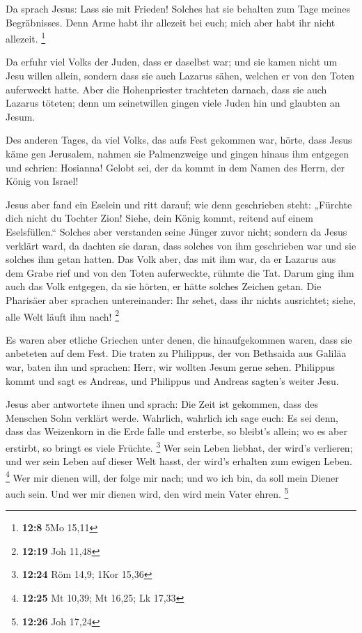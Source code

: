  Da sprach Jesus: Lass sie mit Frieden! Solches hat sie
behalten zum Tage meines Begräbnisses.  Denn Arme habt ihr
allezeit bei euch; mich aber habt ihr nicht allezeit. \footnote{\textbf{12:8}
  5Mo 15,11}

 Da erfuhr viel Volks der Juden, dass er daselbst war; und
sie kamen nicht um Jesu willen allein, sondern dass sie auch Lazarus
sähen, welchen er von den Toten auferweckt hatte.  Aber die
Hohenpriester trachteten darnach, dass sie auch Lazarus töteten;
 denn um seinetwillen gingen viele Juden hin und glaubten
an Jesum.

 Des anderen Tages, da viel Volks, das aufs Fest gekommen
war, hörte, dass Jesus käme gen Jerusalem,  nahmen sie
Palmenzweige und gingen hinaus ihm entgegen und schrien: Hosianna!
Gelobt sei, der da kommt in dem Namen des Herrn, der König von Israel!

 Jesus aber fand ein Eselein und ritt darauf; wie denn
geschrieben steht:  „Fürchte dich nicht du Tochter Zion!
Siehe, dein König kommt, reitend auf einem Eselsfüllen.`` 
Solches aber verstanden seine Jünger zuvor nicht; sondern da Jesus
verklärt ward, da dachten sie daran, dass solches von ihm geschrieben
war und sie solches ihm getan hatten.  Das Volk aber, das
mit ihm war, da er Lazarus aus dem Grabe rief und von den Toten
auferweckte, rühmte die Tat.  Darum ging ihm auch das Volk
entgegen, da sie hörten, er hätte solches Zeichen getan. 
Die Pharisäer aber sprachen untereinander: Ihr sehet, dass ihr nichts
ausrichtet; siehe, alle Welt läuft ihm nach! \footnote{\textbf{12:19}
  Joh 11,48}

 Es waren aber etliche Griechen unter denen, die
hinaufgekommen waren, dass sie anbeteten auf dem Fest.  Die
traten zu Philippus, der von Bethsaida aus Galiläa war, baten ihn und
sprachen: Herr, wir wollten Jesum gerne sehen.  Philippus
kommt und sagt es Andreas, und Philippus und Andreas sagten's weiter
Jesu.

 Jesus aber antwortete ihnen und sprach: Die Zeit ist
gekommen, dass des Menschen Sohn verklärt werde.  Wahrlich,
wahrlich ich sage euch: Es sei denn, dass das Weizenkorn in die Erde
falle und ersterbe, so bleibt's allein; wo es aber erstirbt, so bringt
es viele Früchte. \footnote{\textbf{12:24} Röm 14,9; 1Kor 15,36}
 Wer sein Leben liebhat, der wird's verlieren; und wer sein
Leben auf dieser Welt hasst, der wird's erhalten zum ewigen Leben.
\footnote{\textbf{12:25} Mt 10,39; Mt 16,25; Lk 17,33}  Wer
mir dienen will, der folge mir nach; und wo ich bin, da soll mein Diener
auch sein. Und wer mir dienen wird, den wird mein Vater ehren.
\footnote{\textbf{12:26} Joh 17,24}


